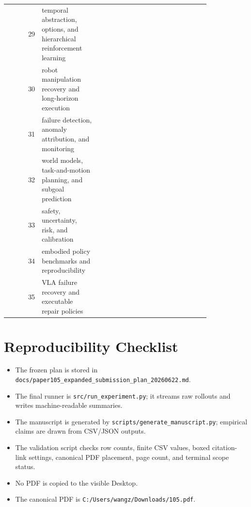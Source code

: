 \documentclass{article}
\begin{document}
\begin{longtable}{@{}r p{0.28\linewidth} p{0.55\linewidth}@{}}
29 & temporal abstraction, options, and hierarchical reinforcement learning & \citep{mueller2022design79,hoffman2025addressing80,mizannddynamic81} \\
30 & robot manipulation recovery and long-horizon execution & \citep{soni2005reinforcement82,lan2021a83,ekvall2008robot84} \\
31 & failure detection, anomaly attribution, and monitoring & \citep{hong2023robust85,shin2024consumers86,osada2024reflectance87} \\
32 & world models, task-and-motion planning, and subgoal prediction & \citep{fu2023the88,luo2023decompositionbased89,sun2019rtpo90} \\
33 & safety, uncertainty, risk, and calibration & \citep{fan2020multirobot91,adubredu2022elephants92,ren2026learning93} \\
34 & embodied policy benchmarks and reproducibility & \citep{huang2025a94,sakib2024consolidating95,jin2022robotic96} \\
35 & VLA failure recovery and executable repair policies & \citep{przystupa2024learning97,oltramari2024enabling98,wu2023design99} \\
\bottomrule
\end{longtable}

\section{Reproducibility Checklist}
\begin{itemize}
\item The frozen plan is stored in \texttt{docs/paper105\_expanded\_submission\_plan\_20260622.md}.
\item The final runner is \texttt{src/run\_experiment.py}; it streams raw rollouts and writes machine-readable summaries.
\item The manuscript is generated by \texttt{scripts/generate\_manuscript.py}; empirical claims are drawn from CSV/JSON outputs.
\item The validation script checks row counts, finite CSV values, boxed citation-link settings, canonical PDF placement, page count, and terminal scope status.
\item No PDF is copied to the visible Desktop.
\item The canonical PDF is \texttt{C:/Users/wangz/Downloads/105.pdf}.
\end{itemize}
\end{document}
